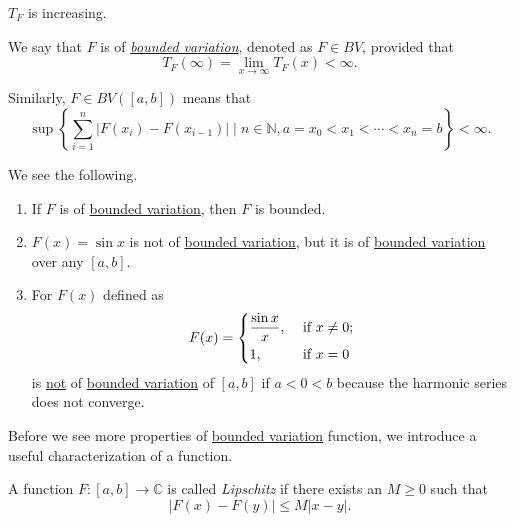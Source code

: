 \begin{remark}
	\(T_F\) is increasing.
\end{remark}

\begin{definition}\label{def:bounded-variation}
	We say that \(F\) is of \emph{\hyperref[def:bounded-variation]{bounded variation}}, denoted as \(F \in BV\), provided that
	\[
		T_F(\infty) = \lim_{x \to \infty} T_F(x) < \infty.
	\]

	Similarly, \(F \in BV([a,b])\) means that
	\[
		\sup \left\{\sum_{i=1}^n \left\vert F(x_i) - F(x_{i-1}) \right\vert \mid n \in \mathbb{N} , a = x_0 < x_1 < \cdots < x_n = b\right\} < \infty.
	\]
\end{definition}

\begin{remark}
	We see the following.
	\begin{enumerate}[(1)]
		\item If \(F\) is of \hyperref[def:bounded-variation]{bounded variation}, then \(F\) is bounded.
		\item \(F(x) = \sin x\) is not of \hyperref[def:bounded-variation]{bounded variation}, but it is of \hyperref[def:bounded-variation]{bounded variation}
		      over any \([a,b]\).
		\item For \(F(x)\) defined as
		      \[
			      F(x) = \begin{dcases}
				      \frac{\sin x}{x}, & \text{ if } x\neq 0 ; \\
				      1,                & \text{ if } x = 0
			      \end{dcases}
		      \]
		      is \underline{not} of \hyperref[def:bounded-variation]{bounded variation} of \([a,b]\) if \(a < 0 < b\) because the harmonic series does not converge.
	\end{enumerate}
\end{remark}

Before we see more properties of \hyperref[def:bounded-variation]{bounded variation} function, we introduce a useful characterization of a function.
\begin{definition}[Lipschitz]\label{def:Lipschitz}
	A function \(F \colon [a,b] \to \mathbb{C} \) is called \emph{Lipschitz} if there exists an
	\(M \geq 0\) such that
	\[
		\left\vert F(x) - F(y) \right\vert \leq M \left\vert x - y \right\vert.
	\]
\end{definition}

